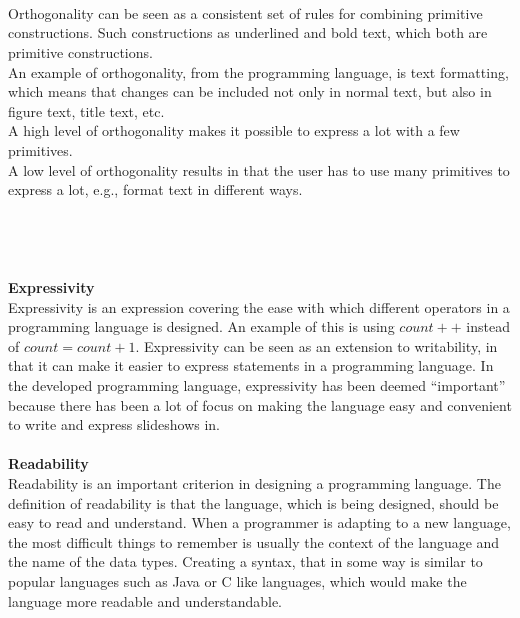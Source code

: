 \\ \\
 \\
Orthogonality can be seen as a consistent set of rules for combining primitive constructions. Such constructions as underlined and bold text, which both are primitive constructions. \\
An example of orthogonality, from the programming language, is text formatting, which means that changes can be included not only in normal text, but also in figure text, title text, etc. \\
A high level of orthogonality makes it possible to express a lot with a few primitives. \\
A low level of orthogonality results in that the user has to use many primitives to express a lot, e.g., format text in different ways.
\\ \\
 \\
\\ \\
\textbf{Expressivity} \\
Expressivity is an expression covering the ease with which different operators in a programming language is designed. An example of this is using $count++$ instead of $count = count + 1$. Expressivity can
be seen as an extension to writability, in that it can make it easier to express statements in a programming language. In the developed programming language, expressivity has been deemed ``important'' because there has been a lot of focus on making the language easy and convenient to write and express slideshows in.
\\ \\
\textbf{Readability} \\
Readability is an important criterion in designing a programming language. The definition of readability is that the language, which is being designed, should be easy to read and understand. When a programmer is adapting to a new language, the most difficult things to remember is usually the context of the language and the name of the data types. Creating a syntax, that in some way is similar to popular languages such as Java or C like languages, which would make the language more readable and understandable. \\
